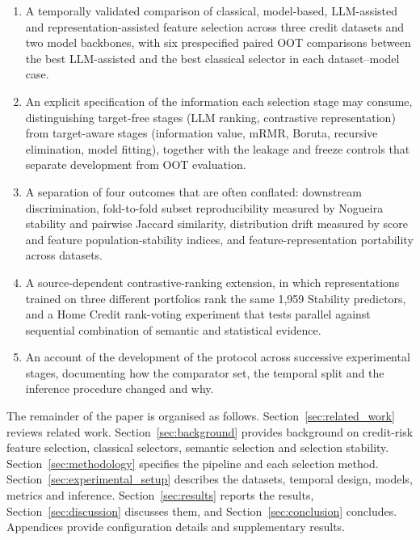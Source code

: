 \documentclass[preprint,12pt]{elsarticle}
\begin{document}
\begin{enumerate}
    \item A temporally validated comparison of classical, model-based, LLM-assisted and representation-assisted feature selection across three credit datasets and two model backbones, with six prespecified paired OOT comparisons between the best LLM-assisted and the best classical selector in each dataset--model case.
    \item An explicit specification of the information each selection stage may consume, distinguishing target-free stages (LLM ranking, contrastive representation) from target-aware stages (information value, mRMR, Boruta, recursive elimination, model fitting), together with the leakage and freeze controls that separate development from OOT evaluation.
    \item A separation of four outcomes that are often conflated: downstream discrimination, fold-to-fold subset reproducibility measured by Nogueira stability and pairwise Jaccard similarity, distribution drift measured by score and feature population-stability indices, and feature-representation portability across datasets.
    \item A source-dependent contrastive-ranking extension, in which representations trained on three different portfolios rank the same 1,959 Stability predictors, and a Home Credit rank-voting experiment that tests parallel against sequential combination of semantic and statistical evidence.
    \item An account of the development of the protocol across successive experimental stages, documenting how the comparator set, the temporal split and the inference procedure changed and why.
\end{enumerate}

The remainder of the paper is organised as follows. Section~\ref{sec:related_work} reviews related work. Section~\ref{sec:background} provides background on credit-risk feature selection, classical selectors, semantic selection and selection stability. Section~\ref{sec:methodology} specifies the pipeline and each selection method. Section~\ref{sec:experimental_setup} describes the datasets, temporal design, models, metrics and inference. Section~\ref{sec:results} reports the results, Section~\ref{sec:discussion} discusses them, and Section~\ref{sec:conclusion} concludes. Appendices provide configuration details and supplementary results.


\end{document}
